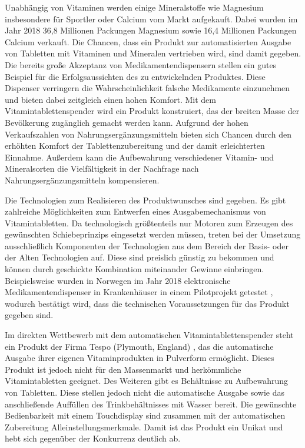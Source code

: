 Unabhängig von Vitaminen werden einige Mineralstoffe wie Magnesium insbesondere für Sportler oder Calcium vom Markt aufgekauft. Dabei wurden im Jahr 2018 36,8 Millionen Packungen Magnesium sowie 16,4 Millionen Packungen Calcium verkauft. Die Chancen, dass ein Produkt zur automatisierten Ausgabe von Tabletten mit Vitaminen und Mineralen vertrieben wird, sind damit gegeben. Die bereits große Akzeptanz von Medikamentendispensern stellen ein gutes Beispiel für die Erfolgsaussichten des zu entwickelnden Produktes. Diese Dispenser verringern die Wahrscheinlichkeit falsche Medikamente einzunehmen und bieten dabei zeitgleich einen hohen Komfort. Mit dem Vitamintablettenspender wird ein Produkt konstruiert, das der breiten Masse der Bevölkerung zugänglich gemacht werden kann. Aufgrund der hohen Verkaufszahlen von Nahrungsergänzungsmitteln bieten sich Chancen durch den erhöhten Komfort der Tablettenzubereitung und der damit erleichterten Einnahme. Außerdem kann die Aufbewahrung verschiedener Vitamin- und Mineralsorten die Vielfältigkeit in der Nachfrage nach Nahrungsergänzungsmitteln kompensieren.

Die Technologien zum Realisieren des Produktwunsches sind gegeben. Es gibt zahlreiche Möglichkeiten zum Entwerfen eines Ausgabemechanismus von Vitamintabletten. Da technologisch größtenteils nur Motoren zum Erzeugen des gewünschten Schiebeprinzips eingesetzt werden müssen, treten bei der Umsetzung ausschließlich Komponenten der Technologien aus dem Bereich der Basis- oder der Alten Technologien auf. Diese sind preislich günstig zu bekommen und können durch geschickte Kombination miteinander Gewinne einbringen. Beispielsweise wurden in Norwegen im Jahr 2018 elektronische Medikamentendispenser in Krankenhäuser in einem Pilotprojekt getestet \cite{schneider}, wodurch bestätigt wird, dass die technischen Voraussetzungen für das Produkt gegeben sind.

Im direkten Wettbewerb mit dem automatischen Vitamintablettenspender steht ein Produkt der Firma Tespo (Plymouth, England) \cite{tespo}, das die automatische Ausgabe ihrer eigenen Vitaminprodukten in Pulverform ermöglicht. Dieses Produkt ist jedoch nicht für den Massenmarkt und herkömmliche Vitamintabletten geeignet. Des Weiteren gibt es Behältnisse zu Aufbewahrung von Tabletten. Diese stellen jedoch nicht die automatische Ausgabe sowie das anschließende Auffüllen des Trinkbehältnisses mit Wasser bereit. Die gewünschte Bedienbarkeit mit einem Touchdisplay sind zusammen mit der automatischen Zubereitung Alleinstellungsmerkmale. Damit ist das Produkt ein Unikat und hebt sich gegenüber der Konkurrenz deutlich ab.

